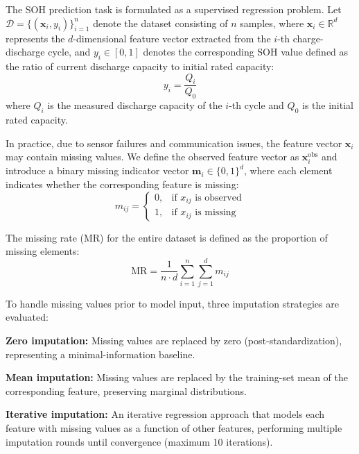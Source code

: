 \documentclass[5p,times]{elsarticle}
\begin{document}
The SOH prediction task is formulated as a supervised regression problem. Let $\mathcal{D} = \{(\mathbf{x}_i, y_i)\}_{i=1}^{n}$ denote the dataset consisting of $n$ samples, where $\mathbf{x}_i \in \mathbb{R}^{d}$ represents the $d$-dimensional feature vector extracted from the $i$-th charge-discharge cycle, and $y_i \in [0, 1]$ denotes the corresponding SOH value defined as the ratio of current discharge capacity to initial rated capacity:
\begin{equation}
    y_i = \frac{Q_i}{Q_0}
    \label{eq:soh}
\end{equation}
where $Q_i$ is the measured discharge capacity of the $i$-th cycle and $Q_0$ is the initial rated capacity.

In practice, due to sensor failures and communication issues, the feature vector $\mathbf{x}_i$ may contain missing values. We define the observed feature vector as $\mathbf{x}_i^{\text{obs}}$ and introduce a binary missing indicator vector $\mathbf{m}_i \in \{0, 1\}^{d}$, where each element indicates whether the corresponding feature is missing:
\begin{equation}
    m_{ij} = 
    \begin{cases}
        0, & \text{if } x_{ij} \text{ is observed} \\
        1, & \text{if } x_{ij} \text{ is missing}
    \end{cases}
    \label{eq:indicator}
\end{equation}

The missing rate (MR) for the entire dataset is defined as the proportion of missing elements:
\begin{equation}
    \text{MR} = \frac{1}{n \cdot d} \sum_{i=1}^{n} \sum_{j=1}^{d} m_{ij}
    \label{eq:mr}
\end{equation}

To handle missing values prior to model input, three imputation strategies are evaluated:

\textbf{Zero imputation:} Missing values are replaced by zero (post-standardization), representing a minimal-information baseline.

\textbf{Mean imputation:} Missing values are replaced by the training-set mean of the corresponding feature, preserving marginal distributions.

\textbf{Iterative imputation:} An iterative regression approach that models each feature with missing values as a function of other features, performing multiple imputation rounds until convergence (maximum 10 iterations).
\end{document}
